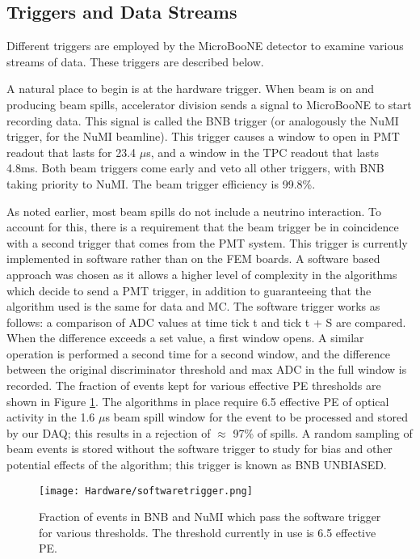 \subsection{Triggers and Data Streams}
\par Different triggers are employed by the MicroBooNE detector to examine various streams of data. These triggers are described below.
\par A natural place to begin is at the hardware trigger.  When beam is on and producing beam spills, accelerator division sends a signal to MicroBooNE to start recording data. This signal is called the BNB trigger (or analogously the NuMI trigger, for the NuMI beamline).  This trigger causes a window to open in PMT readout that lasts for 23.4 $\mu$s, and a window in the TPC readout that lasts 4.8ms.  Both beam triggers come early and veto all other triggers, with BNB taking priority to NuMI.  The beam trigger efficiency is 99.8\%. %
\par As noted earlier, most beam spills do not include a neutrino interaction. To account for this, there is a requirement that the beam trigger be in coincidence with a second trigger that comes from the PMT system. This trigger is currently implemented in software rather than on the FEM boards.  A software based approach was chosen as it allows a higher level of complexity in the algorithms which decide to send a PMT trigger, in addition to guaranteeing that the algorithm used is the same for data and MC.  The software trigger works as follows: a comparison of ADC values at time tick t and tick t + S are compared.  When the difference exceeds a set value, a first window opens. A similar operation is performed a second time for a second window, and the difference between the original discriminator threshold and max ADC in the full window is recorded. The fraction of events kept for various effective PE thresholds are shown in Figure \ref{fig:swtrigger}.  The algorithms in place require 6.5 effective PE of optical activity in the 1.6 $\mu$s beam spill window for the event to be processed and stored by our DAQ; this results in a rejection of $\approx$ 97\% of spills. A random sampling of beam events is stored without the software trigger to study for bias and other potential effects of the algorithm; this trigger is known as BNB UNBIASED. 

\begin{figure}[h!]
\centering
\texttt{[image: Hardware/softwaretrigger.png]}
\caption{ Fraction of events in BNB and NuMI which pass the software trigger for various thresholds. The threshold currently in use is 6.5 effective PE.  } 
\label{fig:swtrigger}
\end{figure}

